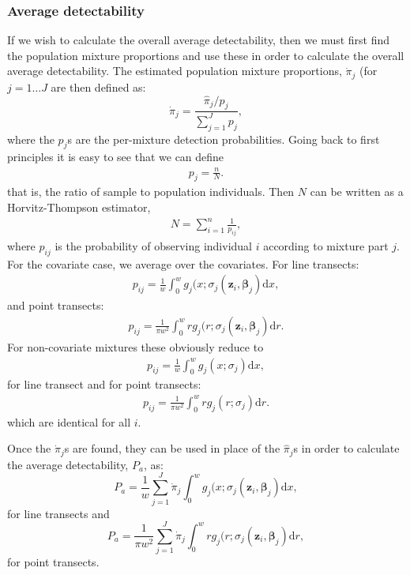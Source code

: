 \subsubsection{Average detectability}
If we wish to calculate the overall average detectability, then we must first find the population mixture proportions and use these in order to calculate the overall average detectability. The estimated population mixture proportions, $\dot{\pi}_j$ (for $j=1\dots J$ are then defined as:
\begin{equation}
\dot{\pi}_j = \frac{\hat{\pi}_j/ p_j}{\sum_{j=1}^J p_j},
\end{equation}
where the $p_j$s are the per-mixture detection probabilities. Going back to first principles it is easy to see that we can define 
\begin{align*}
p_j=\frac{n}{N}.
\end{align*}
that is, the ratio of sample to population individuals. Then $N$ can be written as a Horvitz-Thompson estimator,
\begin{align*}
N=\sum_{i=1}^n \frac{1}{p_{ij}},
\end{align*}
where $p_{ij}$ is the probability of observing individual $i$ according to mixture part $j$.
For the covariate case, we average over the covariates. For line transects:
\begin{align*}
p_{ij} = \frac{1}{w} \int_0^w g_j(x;\sigma_j(\bm{z}_i,\bm{\beta}_j) \text{d}x, 
\end{align*}
and point transects:
\begin{align*}
p_{ij} = \frac{1}{\pi w^2}  \int_0^w r g_j(r;\sigma_j(\bm{z}_i,\bm{\beta}_j) \text{d}r.
\end{align*}
For non-covariate mixtures these obviously reduce to
\begin{align*}
p_{ij}=\frac{1}{w} \int_0^w g_j(x;\sigma_j) \text{d}x, 
\end{align*}
for line transect and for point transects:
\begin{align*}
p_{ij}=\frac{1}{\pi w^2} \int_0^w r g_j(r ;\sigma_j) \text{d}r.
\end{align*}
which are identical for all $i$.

Once the $\dot{\pi}_j$s are found, they can be used in place of the $\hat{\pi}_j$s in order to calculate the average detectability, $P_a$, as:
\begin{equation}
P_a = \frac{1}{w} \sum_{j=1}^J \dot{\pi}_j \int_0^w g_j(x;\sigma_j(\bm{z}_i,\bm{\beta}_j) \text{d}x,
\end{equation}
for line transects and
\begin{equation}
P_a = \frac{1}{\pi w^2} \sum_{j=1}^J \dot{\pi}_j \int_0^w r g_j(r;\sigma_j(\bm{z}_i,\bm{\beta}_j) \text{d}r,
\end{equation}
for point transects.

